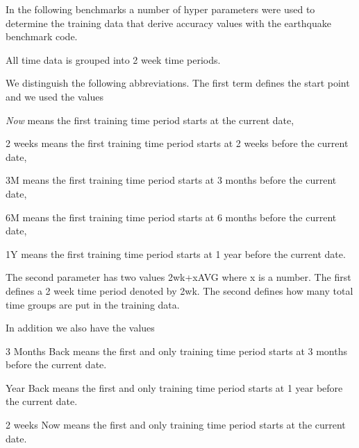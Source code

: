 In the following benchmarks a number of hyper parameters were used to
determine the training data that derive accuracy values with the
earthquake benchmark code.

All time data is grouped into 2 week time periods.

We distinguish the following abbreviations. The first term defines the
start point and we used the values

{\em Now} means the first training time period starts at the current
date,

2 weeks means the first training time period starts at 2 weeks before
the current date,

3M means the first training time period starts at 3 months before the
current date,

6M means the first training time period starts at 6 months before the
current date,

1Y means the first training time period starts at 1 year before the
current date.

The second parameter has two values 2wk+xAVG where x is a number. The
first defines a 2 week time period denoted by 2wk. The second defines
how many total time groups are put in the training data.

In addition we also have the values

3 Months Back means the first and only training time period starts at 3 months before the current date.

Year Back means the first and only training time period starts at 1 year before the current date.

2 weeks Now means the first and only training time period starts at the current date.

